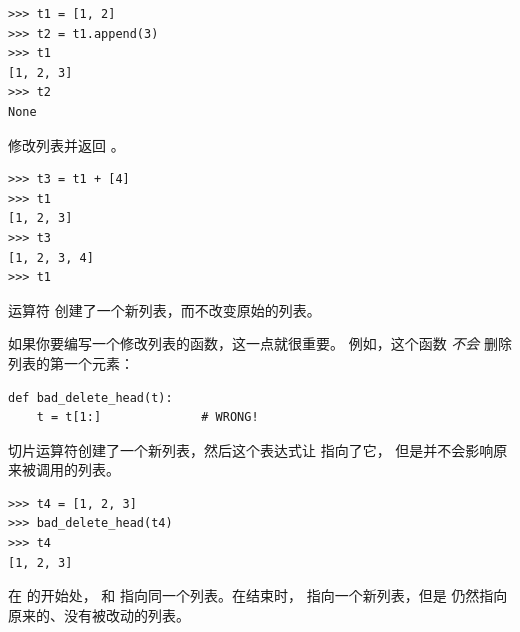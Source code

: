 %
\begin{lstlisting}
>>> t1 = [1, 2]
>>> t2 = t1.append(3)
>>> t1
[1, 2, 3]
>>> t2
None
\end{lstlisting}

%

 修改列表并返回 。

%
\begin{lstlisting}
>>> t3 = t1 + [4]
>>> t1
[1, 2, 3]
>>> t3
[1, 2, 3, 4]
>>> t1
\end{lstlisting}

%

运算符 \li{+} 创建了一个新列表，而不改变原始的列表。


如果你要编写一个修改列表的函数，这一点就很重要。
例如，这个函数 {\em 不会} 删除列表的第一个元素：

%
\begin{lstlisting}
def bad_delete_head(t):
    t = t[1:]              # WRONG!
\end{lstlisting}

%

切片运算符创建了一个新列表，然后这个表达式让  指向了它，
但是并不会影响原来被调用的列表。

  

%
\begin{lstlisting}
>>> t4 = [1, 2, 3]
>>> bad_delete_head(t4)
>>> t4
[1, 2, 3]
\end{lstlisting}

%

在  的开始处， 和  指向同一个列表。在结束时， 指向一个新列表，但是  仍然指向原来的、没有被改动的列表。


